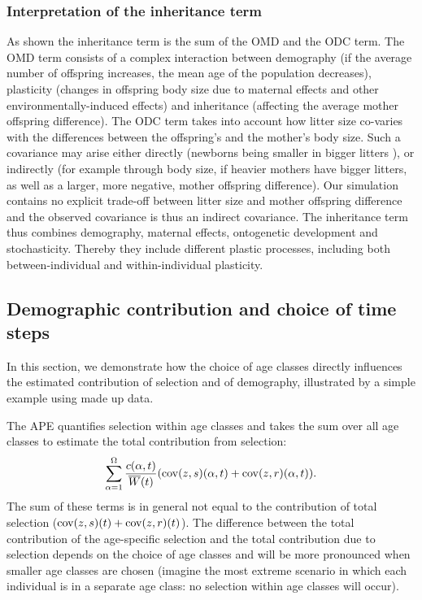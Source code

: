 \subsubsection{Interpretation of the inheritance term}\label{app:ape:inh:intp}
As shown the inheritance term is the sum of the OMD and the ODC term. The OMD term consists of a complex interaction between demography (if the average number of offspring increases, the mean age of the population decreases), plasticity (changes in offspring body size due to maternal effects and other environmentally-induced effects) and inheritance (affecting the average mother offspring difference). The ODC term takes into account how litter size co-varies with the differences between the offspring's and the mother's body size. Such a covariance may arise either directly (newborns being smaller in bigger litters \parencite[e.g.\;][]{speakman2008}), or indirectly (for example through body size, if heavier mothers have bigger litters, as well as a larger, more negative, mother offspring difference). Our simulation contains no explicit trade-off between litter size and mother offspring difference and the observed covariance is thus an indirect covariance. The inheritance term thus combines demography, maternal effects, ontogenetic development and stochasticity. Thereby they include different plastic processes, including both between-individual and within-individual plasticity.
\subsection{Demographic contribution and choice of time steps}\label{app:ape:step}
In this section, we demonstrate how the choice of age classes directly influences the estimated contribution of selection and of demography, illustrated by a simple example using made up data.

The APE quantifies selection within age classes and takes the sum over all age classes to estimate the total contribution from selection:
\begin{equation}
\sum_{\alpha=1}^{\Omega} \frac{c(\alpha,t)}{\overline{W}(t)} (\mathrm{cov}(z,s)(\alpha,t)+\mathrm{cov}(z,r)(\alpha,t)).
\end{equation}
The sum of these terms is in general not equal to the contribution of total selection ($\mathrm{cov}(z,s)(t) + \mathrm{cov}(z,r)(t)$). The difference between the total contribution of the age-specific selection and the total contribution due to selection depends on the choice of age classes and will be more pronounced when smaller age classes are chosen (imagine the most extreme scenario in which each individual is in a separate age class: no selection within age classes will occur). 

